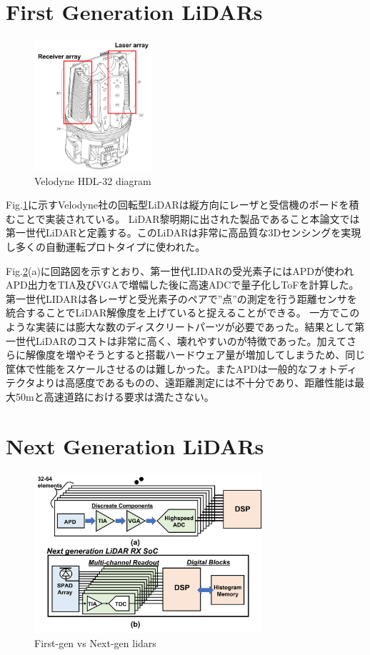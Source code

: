 \documentclass[letterpaper, 10 pt, conference]{ieeeconf}  %
\begin{document}
\section{First Generation LiDARs}
\begin{figure}[!t]
\centering
 \includegraphics[width=0.39\textwidth]{figs/velo.png}
  \caption{Velodyne HDL-32 diagram \cite{velopatent}}
\label{velo}
\end{figure}

Fig.\ref{velo}に示すVelodyne社の回転型LiDAR\cite{velodyne, velopatent}は縦方向にレーザと受信機のボードを積むことで実装されている。
LiDAR黎明期に出された製品であること本論文では第一世代LiDARと定義する。このLiDARは非常に高品質な3Dセンシングを実現し多くの自動運転プロトタイプに使われた\cite{montemerlo2008junior}。

Fig.\ref{next}(a)に回路図を示すとおり、第一世代LIDARの受光素子にはAPDが使われAPD出力をTIA及びVGAで増幅した後に高速ADCで量子化しToFを計算した。
第一世代LIDARは各レーザと受光素子のペアで”点”の測定を行う距離センサを統合することでLiDAR解像度を上げていると捉えることができる。
一方でこのような実装には膨大な数のディスクリートパーツが必要であった。結果として第一世代LiDARのコストは非常に高く、壊れやすいのが特徴であった。加えてさらに解像度を増やそうとすると搭載ハードウェア量が増加してしまうため、同じ筐体で性能をスケールさせるのは難しかった。またAPDは一般的なフォトディテクタよりは高感度であるものの、遠距離測定には不十分であり、距離性能は最大50mと高速道路における要求は満たさない。

\section{Next Generation LiDARs}
\begin{figure}[!t]
\centering
 \includegraphics[width=0.75\textwidth]{figs/nextlidar.png}
  \caption{First-gen vs Next-gen lidars}
\label{next}
\end{figure}
\end{document}
